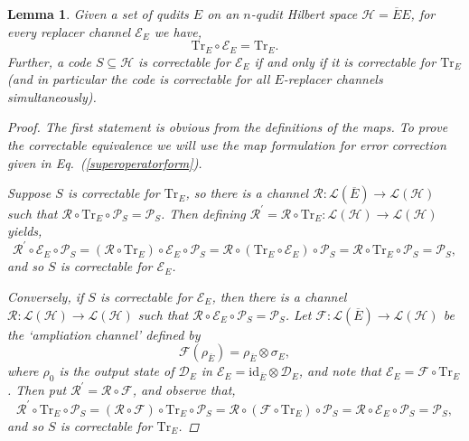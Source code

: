 \documentclass[11pt]{amsart}
\newtheorem{lem}[thm]{Lemma}
\theoremstyle{definition}
\theoremstyle{definition}
\theoremstyle{definition}
\newcommand{\tr}{\textrm{Tr}}
\newcommand{\1}{\mathbb{I}}
\begin{document}
\begin{lem}\label{jointcorrectable}
Given a set of qudits $E$ on an $n$-qudit Hilbert space $\mathcal H = \overline{E} E$, for every replacer channel $\mathcal E_E$ we have,  
\[
\tr_E \circ \mathcal E_E = \tr_E . 
\]
Further, a code $S \subseteq \mathcal H$ is correctable for $\mathcal E_E$ if and only if it is correctable for $\tr_E$ (and in particular the code is correctable for all $E$-replacer channels simultaneously). 

\begin{proof} 
The first statement is obvious from the definitions of the maps. To prove the correctable equivalence we will use the map formulation for error correction given in Eq.~(\ref{superoperatorform}).  

Suppose $S$ is correctable for $\tr_E$, so there is a channel $\mathcal R : \mathcal L(\overline{E}) \rightarrow \mathcal L(\mathcal H)$ such that $\mathcal R \circ \tr_E \circ \mathcal P_S = \mathcal P_S$. Then defining $\mathcal R^\prime = \mathcal R\circ \tr_E : \mathcal L(\mathcal H) \rightarrow \mathcal L(\mathcal H)$ yields, 
\[
\mathcal R^\prime \circ \mathcal E_E \circ \mathcal P_S =  (\mathcal R \circ \tr_E)\circ \mathcal E_E \circ \mathcal P_S = \mathcal R \circ (\tr_E \circ \mathcal E_E) \circ \mathcal P_S = \mathcal R \circ \tr_E \circ \mathcal P_S = \mathcal P_S , 
\]
and so $S$ is correctable for $\mathcal E_E$. 

Conversely, if $S$ is correctable for $\mathcal E_E$, then there is a channel $\mathcal R : \mathcal L(\mathcal H) \rightarrow \mathcal L(\mathcal H)$ such that $\mathcal R \circ \mathcal E_E \circ \mathcal P_S = \mathcal P_S$. Let $\mathcal F :  \mathcal L(\overline{E}) \rightarrow \mathcal L(\mathcal H)$ be the `ampliation channel' defined by 
\[
\mathcal F ( \rho_{\overline{E}} ) = \rho_{\overline{E}} \otimes \sigma_E , 
\]
where $\rho_0$ is the output state of $\mathcal D_E$ in $\mathcal E_E = \mathrm{id}_{\overline{E}}\otimes \mathcal D_E$, and note that $\mathcal E_E = \mathcal F \circ \tr_E$. Then put $\mathcal R^\prime = \mathcal R \circ \mathcal F$, and observe that, 
\[
\mathcal R^\prime \circ \tr_E \circ \mathcal P_S =  (\mathcal R \circ \mathcal F)\circ \tr_E \circ \mathcal P_S = \mathcal R \circ (\mathcal F \circ \tr_E) \circ \mathcal P_S = \mathcal R \circ \mathcal E_E \circ \mathcal P_S = \mathcal P_S , 
\]
and so $S$ is correctable for $\tr_E$. 
\end{proof}
\end{lem}
\end{document}
